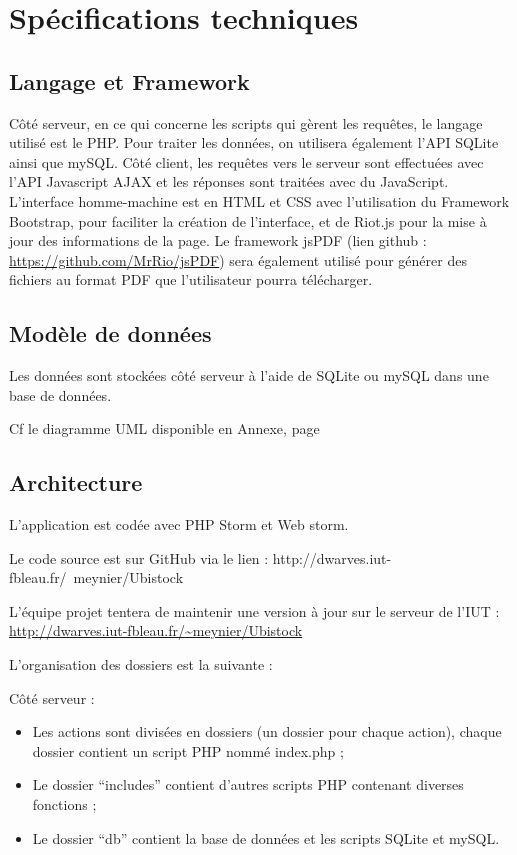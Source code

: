 \documentclass[a4paper, 12pt]{report}
\begin{document}
\chapter{Spécifications techniques}
	\section{Langage et Framework}
		Côté serveur, en ce qui concerne les scripts qui gèrent les requêtes, le langage utilisé est le PHP. Pour traiter les données, on utilisera également l’API SQLite ainsi que mySQL. 
		Côté client, les requêtes vers le serveur sont effectuées avec l’API Javascript AJAX et les réponses sont traitées avec du JavaScript. L’interface homme-machine est en HTML et CSS avec l’utilisation du Framework Bootstrap, pour faciliter la création de l’interface, et de Riot.js pour la mise à jour des informations de la page. Le framework jsPDF (lien github : \url{https://github.com/MrRio/jsPDF}) sera également utilisé pour générer des fichiers au format PDF que l’utilisateur pourra télécharger. 

	\section{Modèle de données}
		Les données sont stockées côté serveur à l’aide de SQLite ou mySQL dans une base de données.

		Cf le diagramme UML disponible en Annexe, page \pageref*{fig:UML} 			


	\section{Architecture}
		L’application est codée avec PHP Storm et Web storm. 

		Le code source est sur GitHub via le lien : http://dwarves.iut-fbleau.fr/~meynier/Ubistock 

		L’équipe projet tentera de maintenir une version à jour sur le serveur de l’IUT : \url{http://dwarves.iut-fbleau.fr/~meynier/Ubistock}

		L’organisation des dossiers est la suivante : 

		Côté serveur :  
		\begin{itemize}
			\item Les actions sont divisées en dossiers (un dossier pour chaque action), chaque dossier contient un script PHP nommé index.php ;
			\item Le dossier “includes” contient d’autres scripts PHP contenant diverses fonctions ;
			\item Le dossier “db” contient la base de données et les scripts SQLite et mySQL.
		\end{itemize}  
\end{document}

